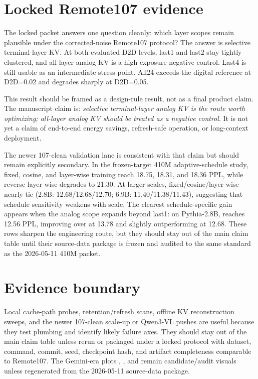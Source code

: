 \section{Locked Remote107 evidence}

The locked packet answers one question cleanly: which layer scopes remain plausible under the corrected-noise Remote107 protocol? The answer is selective terminal-layer KV. At both evaluated D2D levels, last1 and last2 stay tightly clustered, and all-layer analog KV is a high-exposure negative control. Last4 is still usable as an intermediate stress point. All24 exceeds the digital reference at D2D=0.02 and degrades sharply at D2D=0.05.

This result should be framed as a design-rule result, not as a final product claim. The manuscript claim is: \emph{selective terminal-layer analog KV is the route worth optimizing; all-layer analog KV should be treated as a negative control}. It is not yet a claim of end-to-end energy savings, refresh-safe operation, or long-context deployment.

The newer 107-clean validation lane is consistent with that claim but should remain explicitly secondary. In the frozen-target 410M adaptive-schedule study, fixed, cosine, and layer-wise training reach 18.75, 18.31, and 18.36 PPL, while reverse layer-wise degrades to 21.30. At larger scales, fixed/cosine/layer-wise nearly tie (2.8B: 12.68/12.68/12.70; 6.9B: 11.40/11.38/11.43), suggesting that schedule sensitivity weakens with scale. The clearest schedule-specific gain appears when the analog scope expands beyond last1: on Pythia-2.8B, \texttt{} reaches 12.56 PPL, improving over \texttt{} at 13.78 and slightly outperforming \texttt{} at 12.68. These rows sharpen the engineering route, but they should stay out of the main claim table until their source-data package is frozen and audited to the same standard as the 2026-05-11 410M packet.

\section{Evidence boundary}

Local cache-path probes, retention/refresh scans, offline KV reconstruction sweeps, and the newer 107-clean scale-up or Qwen3-VL pushes are useful because they test plumbing and identify likely failure axes. They should stay out of the main claim table unless rerun or packaged under a locked protocol with dataset, command, commit, seed, checkpoint hash, and artifact completeness comparable to Remote107. The Gemini-era plots \texttt{}, \texttt{}, and \texttt{} remain candidate/audit visuals unless regenerated from the 2026-05-11 source-data package.

